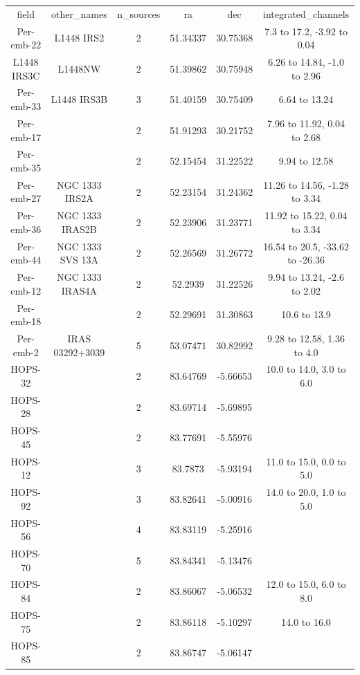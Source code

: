 \begin{deluxetable}
\begin{tabular}{cccccc}
field & other_names & n_sources & ra & dec & integrated_channels \\
Per-emb-22 & L1448 IRS2 & 2 & 51.34337 & 30.75368 & 7.3 to 17.2, -3.92 to 0.04 \\
L1448 IRS3C & L1448NW & 2 & 51.39862 & 30.75948 & 6.26 to 14.84, -1.0 to 2.96 \\
Per-emb-33 & L1448 IRS3B & 3 & 51.40159 & 30.75409 & 6.64 to 13.24 \\
Per-emb-17 & \nodata & 2 & 51.91293 & 30.21752 & 7.96 to 11.92, 0.04 to 2.68 \\
Per-emb-35 & \nodata & 2 & 52.15454 & 31.22522 & 9.94 to 12.58 \\
Per-emb-27 & NGC 1333 IRS2A & 2 & 52.23154 & 31.24362 & 11.26 to 14.56, -1.28 to 3.34 \\
Per-emb-36 & NGC 1333 IRAS2B & 2 & 52.23906 & 31.23771 & 11.92 to 15.22, 0.04 to 3.34 \\
Per-emb-44 & NGC 1333 SVS 13A & 2 & 52.26569 & 31.26772 & 16.54 to 20.5, -33.62 to -26.36 \\
Per-emb-12 & NGC 1333 IRAS4A & 2 & 52.2939 & 31.22526 & 9.94 to 13.24, -2.6 to 2.02 \\
Per-emb-18 & \nodata & 2 & 52.29691 & 31.30863 & 10.6 to 13.9 \\
Per-emb-2 & IRAS 03292+3039 & 5 & 53.07471 & 30.82992 & 9.28 to 12.58, 1.36 to 4.0 \\
HOPS-32 & \nodata & 2 & 83.64769 & -5.66653 & 10.0 to 14.0, 3.0 to 6.0 \\
HOPS-28 & \nodata & 2 & 83.69714 & -5.69895 & \nodata \\
HOPS-45 & \nodata & 2 & 83.77691 & -5.55976 & \nodata \\
HOPS-12 & \nodata & 3 & 83.7873 & -5.93194 & 11.0 to 15.0, 0.0 to 5.0 \\
HOPS-92 & \nodata & 3 & 83.82641 & -5.00916 & 14.0 to 20.0, 1.0 to 5.0 \\
HOPS-56 & \nodata & 4 & 83.83119 & -5.25916 & \nodata \\
HOPS-70 & \nodata & 5 & 83.84341 & -5.13476 & \nodata \\
HOPS-84 & \nodata & 2 & 83.86067 & -5.06532 & 12.0 to 15.0, 6.0 to 8.0 \\
HOPS-75 & \nodata & 2 & 83.86118 & -5.10297 & 14.0 to 16.0 \\
HOPS-85 & \nodata & 2 & 83.86747 & -5.06147 & \nodata \\

\end{tabular}
\end{deluxetable}
